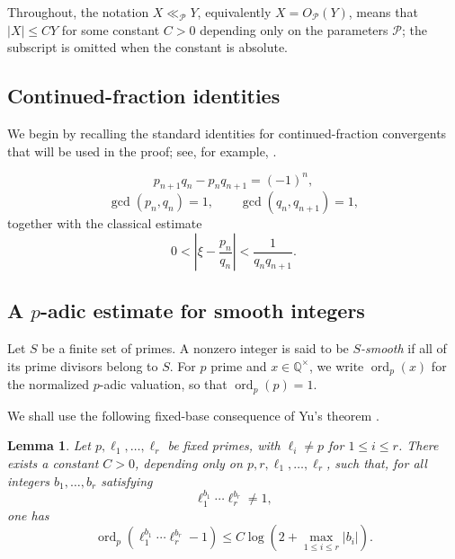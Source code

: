 \documentclass[11pt]{amsart}
\newtheorem{lemma}[theorem]{Lemma}
\theoremstyle{remark}
\newcommand{\Q}{\mathbb Q}
\DeclareMathOperator{\ord}{ord}
\begin{document}
Throughout, the notation $X\ll_{\mathcal P}Y$, equivalently
$X=O_{\mathcal P}(Y)$, means that $|X|\le CY$ for some constant
$C>0$ depending only on the parameters $\mathcal P$; the subscript is
omitted when the constant is absolute.

\subsection{Continued-fraction identities}

We begin by recalling the standard identities for continued-fraction
convergents that will be used in the proof; see, for example,
\cite[Chapter~1]{Bugeaud2004}.

\begin{equation}\label{eq:det}
 p_{n+1}q_n-p_nq_{n+1}=(-1)^n,
\end{equation}
\begin{equation}\label{eq:coprime}
 \gcd(p_n,q_n)=1,
 \qquad
 \gcd(q_n,q_{n+1})=1,
\end{equation}
together with the classical estimate
\begin{equation}\label{eq:approx}
 0<
 \left|\xi-\frac{p_n}{q_n}\right|
 <
 \frac{1}{q_nq_{n+1}}.
\end{equation}

\subsection{A $p$-adic estimate for smooth integers}

Let $S$ be a finite set of primes. A nonzero integer is said to be
\textit{$S$-smooth} if all of its prime divisors belong to $S$. For
$p$ prime and $x\in\Q^\times$, we write $\ord_p(x)$ for the normalized
$p$-adic valuation, so that $\ord_p(p)=1$.

We shall use the following fixed-base consequence of Yu's theorem \cite[\S1.1, p.~190]{Yu2007}.

\begin{lemma}\label{lem:Yu-special}
Let $p,\ell_1,\ldots,\ell_r$ be fixed primes, with $\ell_i\ne p$
for $1\le i\le r$. There exists a constant $C>0$, depending only on
$p,r,\ell_1,\ldots,\ell_r$, such that, for all integers
$b_1,\ldots,b_r$ satisfying
\[
 \ell_1^{b_1}\cdots\ell_r^{b_r}\ne1,
\]
one has
\begin{equation}\label{eq:Yu-special}
 \ord_p\!\left(
 \ell_1^{b_1}\cdots\ell_r^{b_r}-1
 \right)
 \le
 C\log\left(2+\max_{1\le i\le r}|b_i|\right).
\end{equation}
\end{lemma}
\end{document}
